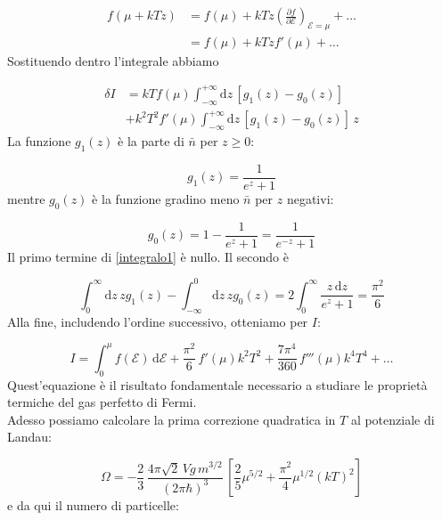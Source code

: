 \documentclass[a4paper]{report}
\begin{document}
\begin{equation}
    \begin{split}
        f(\mu + k T z) & = f(\mu) + k T z \left(\frac{\partial f}{\partial \mathcal{E}}\right)_{\mathcal{E}=\mu} + \dots \\
        & = f(\mu) + k T z f'(\mu)+ \dots
    \end{split}
\end{equation}
Sostituendo dentro l'integrale abbiamo

\begin{equation}
    \begin{split}
        \delta I & = k T f(\mu)\int_{-\infty}^{+\infty} \mathrm{d}z \, [g_1(z)-g_0(z)] \\
        & + k^2 T^2 f'(\mu) \int_{-\infty}^{+\infty} \mathrm{d}z \, [g_1(z)-g_0(z)] \,z
    \end{split}
    \label{integralo1}
\end{equation}
La funzione $g_1(z)$ è la parte di $\bar{n}$ per $z\geq 0$:

\begin{equation}
    g_1(z) = \frac{1}{e^z+1}
\end{equation}
mentre $g_0(z)$ è la funzione gradino meno $\bar{n}$ per $z$ negativi:

\begin{equation}
    g_0(z) = 1- \frac{1}{e^z+1} = \frac{1}{e^{-z}+1}
\end{equation}
Il primo termine di \eqref{integralo1} è nullo. Il secondo è

\begin{equation}
    \int_{0}^{\infty} \mathrm{d}z \, z g_1(z) - \int_{-\infty}^0 \mathrm{d}z\, z g_0(z) = 2 \int_0^{\infty} \frac{z\,\mathrm{d}z}{e^z+1} = \frac{\pi^2}{6}
\end{equation}
Alla fine, includendo l'ordine successivo, otteniamo per $I$:

\begin{equation}
    I = \int_0^{\mu} f(\mathcal{E})\,\mathrm{d}\mathcal{E} + \frac{\pi^2}{6}\,f'(\mu) k^2 T^2 + \frac{7\pi^4}{360}\,f'''(\mu) k^4 T^4 + \dots
\end{equation}
Quest'equazione è il risultato fondamentale necessario a studiare le proprietà termiche del gas perfetto di Fermi.\\
Adesso possiamo calcolare la prima correzione quadratica in $T$ al potenziale di Landau:

\begin{equation}
    \Omega = -\frac{2}{3}\,\frac{4\pi\sqrt{2}\, V g\, m^{3/2}}{(2\pi\hbar)^3} \,\left[\frac{2}{5}\mu^{5/2}+\frac{\pi^2}{4}\mu^{1/2}(k T)^2\right] 
\end{equation}
e da qui il numero di particelle:
\end{document}
